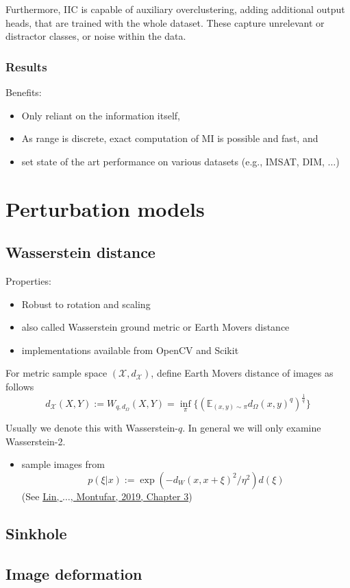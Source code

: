 \documentclass[]{article}
\begin{document}
Furthermore, IIC is capable of auxiliary overclustering, adding additional output heads, that are trained with the whole dataset. These capture unrelevant or distractor classes, or noise within the data.\\

\subsubsection{Results}
Benefits:
\begin{itemize}
	\item Only reliant on the information itself,
	\item As range is discrete, exact computation of MI is possible and fast, and 
	\item set state of the art performance on various datasets (e.g., IMSAT, DIM, $\dots$)
\end{itemize}

\section{Perturbation models}
\subsection{Wasserstein distance}

Properties:
\begin{itemize}
	\item Robust to rotation and scaling
	\item also called Wasserstein ground metric or Earth Movers distance
	\item implementations available from OpenCV and Scikit
\end{itemize}

For metric sample space $(\mathcal{X},d_\mathcal{X})$, define Earth Movers distance of images as follows\\

\begin{equation}
	d_\mathcal{X}(X,Y):= W_{q,d_\Omega}(X,Y) = \inf_\pi \{ (\mathbb{E}_{(x,y)\sim \pi}d_\Omega (x,y)^q)^{\frac{1}{q}} \}
\end{equation} 

Usually we denote this with Wasserstein-$q$. In general we will only examine Wasserstein-2.

\begin{itemize}
	\item sample images from 
	\begin{equation}
		p(\xi|x):= \exp(-d_W(x,x+\xi)^2/\eta^2)d(\xi)
	\end{equation}(See \href{https://arxiv.org/pdf/1909.06860.pdf}{Lin, $\dots$, Montufar, 2019, Chapter 3})
\end{itemize}

\subsection{Sinkhole}

\subsection{Image deformation}
\end{document}
